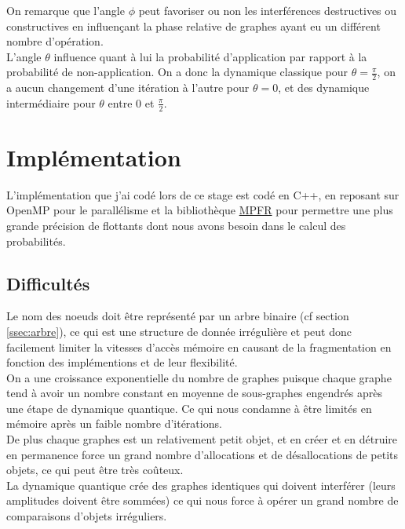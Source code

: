 \documentclass[11pts,french]{article}
\begin{document}
On remarque que l'angle $\phi$ peut favoriser ou non les interférences destructives ou constructives en influençant la phase relative de graphes ayant eu un différent nombre d'opération. \\

L'angle $\theta$ influence quant à lui la probabilité d'application par rapport à la probabilité de non-application. On a donc la dynamique classique pour $\theta = \frac{\pi}{2}$, on a aucun changement d'une itération à l'autre pour $\theta = 0$, et des dynamique intermédiaire pour $\theta$ entre $0$ et $\frac{\pi}{2}$.

\section{ Implémentation }

L'implémentation que j'ai codé lors de ce stage est codé en C++, en reposant sur OpenMP pour le parallélisme et la bibliothèque \href{http://www.mpfr.org}{MPFR} pour permettre une plus grande précision de flottants dont nous avons besoin dans le calcul des probabilités.

\subsection{ Difficultés }

Le nom des noeuds doit être représenté par un arbre binaire (cf section \ref{ssec:arbre}), ce qui est une structure de donnée irrégulière et peut donc facilement limiter la vitesses d'accès mémoire en causant de la fragmentation en fonction des implémentions et de leur flexibilité. \\

On a une croissance exponentielle du nombre de graphes puisque chaque graphe tend à avoir un nombre constant en moyenne de sous-graphes engendrés après une étape de dynamique quantique. Ce qui nous condamne à être limités en mémoire après un faible nombre d'itérations.  \\

De plus chaque graphes est un relativement petit objet, et en créer et en détruire en permanence force un grand nombre d'allocations et de désallocations de petits objets, ce qui peut être très coûteux. \\

La dynamique quantique crée des graphes identiques qui doivent interférer (leurs amplitudes doivent être sommées) ce qui nous force à opérer un grand nombre de comparaisons d'objets irréguliers.
\end{document}
